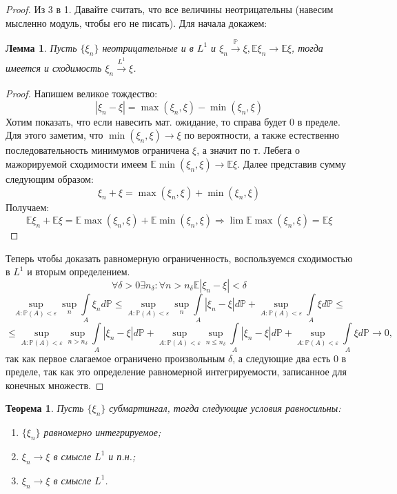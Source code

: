 \documentclass[12pt,a4paper]{article} %
\newtheorem{theorem}{Теорема}
\newtheorem{lemma}{Лемма}
\newcommand{\E}{\mathbb{E}}
\newcommand{\PR}{\mathbb{P}}
\begin{document}
\begin{proof}
		Из 3 в 1. Давайте считать, что все величины неотрицательны (навесим мысленно модуль, чтобы его не писать). Для начала докажем:
		\begin{lemma}
			Пусть $\{\xi_n\}$ неотрицательные и в $L^1$ и $\xi_n\xrightarrow[]{\PR}\xi, \E\xi_n\rightarrow\E\xi$, тогда имеется и сходимость $\xi_n\xrightarrow[]{L^1}\xi$.
		\end{lemma}
		\begin{proof}
			Напишем великое тождество:
			$$|\xi_n-\xi|=\max(\xi_n,\xi)-\min(\xi_n,\xi)$$
			Хотим показать, что если навесить мат. ожидание, то справа будет 0 в пределе. Для этого заметим, что $\min(\xi_n,\xi)\rightarrow\xi$ по вероятности, а также естественно последовательность минимумов ограничена $\xi$, а значит по т. Лебега о мажорируемой сходимости имеем $\E\min(\xi_n,\xi)\rightarrow\E\xi$. Далее представив сумму следующим образом:
			$$\xi_n+\xi=\max(\xi_n,\xi)+\min(\xi_n,\xi)$$
			Получаем:
			$$\E\xi_n+\E\xi=\E\max(\xi_n,\xi)+\E\min(\xi_n,\xi)\Rightarrow\lim\E\max(\xi_n,\xi)=\E\xi$$
		\end{proof}
		Теперь чтобы доказать равномерную ограниченность, воспользуемся сходимостью в $L^1$ и вторым определением.
		$$\forall\delta>0\exists n_{\delta}:\forall n>n_{\delta}\E|\xi_n-\xi|<\delta$$
		$$\sup\limits_{A:\PR(A)<\varepsilon}\sup\limits_n\int\limits_A\xi_nd\PR\leq\sup\limits_{A:\PR(A)<\varepsilon}\sup\limits_n\int\limits_A|\xi_n-\xi|d\PR+\sup\limits_{A:\PR(A)<\varepsilon}\int\limits_A\xi d\PR\leq$$
		$$\leq\sup\limits_{A:\PR(A)<\varepsilon}\sup\limits_{n>n_{\delta}}\int\limits_A|\xi_n-\xi|d\PR+\sup\limits_{A:\PR(A)<\varepsilon}\sup\limits_{n\leq n_{\delta}}\int\limits_A|\xi_n-\xi|d\PR+\sup\limits_{A:\PR(A)<\varepsilon}\int\limits_A\xi d\PR\rightarrow0,$$
		так как первое слагаемое ограничено произвольным $\delta$, а следующие два есть 0 в пределе, так как это определение равномерной интегрируемости, записанное для конечных множеств.
	\end{proof}
	\begin{theorem}
		Пусть $\{\xi_n\}$ субмартингал, тогда следующие условия равносильны:
		\begin{enumerate}
			\item $\{\xi_n\}$ равномерно интегрируемое;
			\item $\xi_n\rightarrow\xi$ в смысле $L^1$ и п.н.;
			\item $\xi_n\rightarrow\xi$ в смысле $L^1$.
		\end{enumerate}
	\end{theorem}
\end{document}
